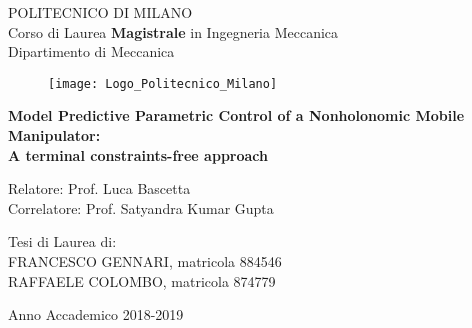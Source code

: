 \thispagestyle{empty}
\vspace*{-2cm} \bfseries{
\begin{center}
  \large
  POLITECNICO DI MILANO\\
  \normalsize
  Corso di Laurea \textbf{Magistrale} in Ingegneria Meccanica\\
  Dipartimento di Meccanica\\
  \begin{figure}[htbp]
    \begin{center}
      \texttt{[image: Logo\_Politecnico\_Milano]}
	 \centering
    \end{center}
  \end{figure}
  \vspace*{0.3cm} \LARGE


  \textbf{Model Predictive Parametric Control of a Nonholonomic Mobile Manipulator: \\ A terminal constraints-free approach}\\


\end{center}
\vspace*{1.5cm} \large
\begin{flushleft}


  Relatore: Prof. Luca Bascetta \\
  Correlatore: Prof. Satyandra Kumar Gupta\\
 

\end{flushleft}
\vspace*{1.5cm}
\begin{flushright}


  Tesi di Laurea di:\\ FRANCESCO GENNARI, matricola 884546 \\
  RAFFAELE COLOMBO, matricola 874779 \\

\end{flushright}
\vspace*{1.5cm}
\begin{center}



  Anno Accademico 2018-2019
\end{center} \clearpage
}
